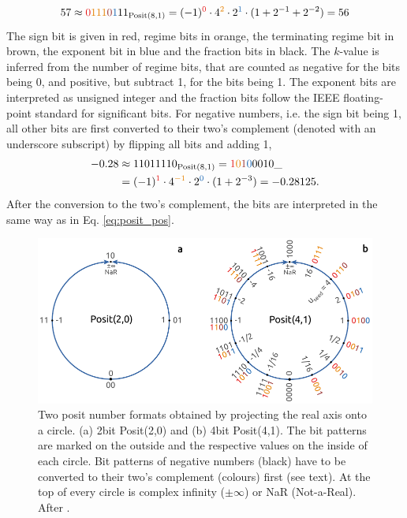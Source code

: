 \documentclass[draft]{agujournal2019}
\newcommand{\op}{\operatorname}
\begin{document}
\begin{equation}
57 \approx {\color{psign}0}{\color{pregime}111}{\color{pregimet}0}{\color{pexpo}1}11_{\op{Posit}(8,1)} = (-1)^{\color{psign}0} \cdot 4^{\color{pregime}2} \cdot 2^{\color{pexpo}1} \cdot (1+2^{-1}+2^{-2}) = 56
\label{eq:posit_pos}
\end{equation}
The sign bit is given in red, regime bits in orange, the terminating regime bit in brown, the exponent bit in blue and the fraction bits in black. The $k$-value is inferred from the number of regime bits, that are counted as negative for the bits being 0, and positive, but subtract 1, for the bits being 1. The exponent bits are interpreted as unsigned integer and the fraction bits follow the IEEE floating-point standard for significant bits. For negative numbers, i.e. the sign bit being 1, all other bits are first converted to their two's complement (denoted with an underscore subscript) by flipping all bits and adding 1,
\begin{equation}
\begin{split}
-0.28 &  \approx 11011110_{\op{Posit}(8,1)} = {\color{psign}1}{\color{pregime}0}{\color{pregimet}1}{\color{pexpo}0}0010\_ \\
& = (-1)^{\color{psign}1} \cdot 4^{\color{pregime}-1} \cdot 2^{\color{pexpo}0} \cdot (1+2^{-3}) = -0.28125.
\end{split}
\label{eq:2comp}
\end{equation}
After the conversion to the two's complement, the bits are interpreted in the same way as in Eq. \ref{eq:posit_pos}.

\begin{figure}
\center
\includegraphics[width=1\textwidth]{figs/circles.pdf}
\caption{Two posit number formats obtained by projecting the real axis onto a circle. (a) 2bit Posit(2,0) and (b) 4bit Posit(4,1). The bit patterns are marked on the outside and the respective values on the inside of each circle. Bit patterns of negative numbers (black) have to be converted to their two's complement (colours) first (see text). At the top of every circle is complex infinity ($\pm \infty$) or NaR (Not-a-Real). After . }
\label{fig:circle}
\end{figure}
\end{document}
